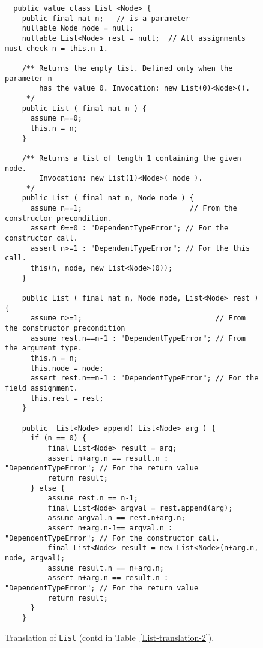 \begin{figure*}
{\footnotesize
\begin{verbatim}
  public value class List <Node> {
    public final nat n;   // is a parameter
    nullable Node node = null;
    nullable List<Node> rest = null;  // All assignments must check n = this.n-1.

    /** Returns the empty list. Defined only when the parameter n
        has the value 0. Invocation: new List(0)<Node>().
     */
    public List ( final nat n ) {
      assume n==0;
      this.n = n;
    }

    /** Returns a list of length 1 containing the given node.
        Invocation: new List(1)<Node>( node ).
     */
    public List ( final nat n, Node node ) {
      assume n==1;                         // From the constructor precondition.
      assert 0==0 : "DependentTypeError"; // For the constructor call.
      assert n>=1 : "DependentTypeError"; // For the this call.
      this(n, node, new List<Node>(0));
    }

    public List ( final nat n, Node node, List<Node> rest ) {
      assume n>=1;                               // From the constructor precondition
      assume rest.n==n-1 : "DependentTypeError"; // From the argument type.
      this.n = n;
      this.node = node;
      assert rest.n==n-1 : "DependentTypeError"; // For the field assignment.
      this.rest = rest;
    }

    public  List<Node> append( List<Node> arg ) {
      if (n == 0) {
          final List<Node> result = arg;
          assert n+arg.n == result.n : "DependentTypeError"; // For the return value
          return result;
      } else {
          assume rest.n == n-1;
          final List<Node> argval = rest.append(arg);
          assume argval.n == rest.n+arg.n;
          assert n+arg.n-1== argval.n : "DependentTypeError"; // For the constructor call.
          final List<Node> result = new List<Node>(n+arg.n, node, argval);
          assume result.n == n+arg.n;
          assert n+arg.n == result.n : "DependentTypeError"; // For the return value
          return result;
      }
    }

\end{verbatim}}
\caption{Translation of {\tt List} (contd in Table~\ref{List-translation-2}).}\label{List-translation}
\end{figure*}
